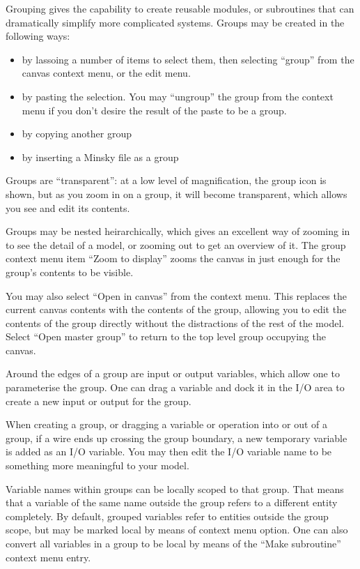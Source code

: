 \label{Group}


Grouping gives the capability to create reusable modules, or subroutines
that can dramatically simplify more complicated systems. Groups may
be created in the following ways: 
\begin{itemize}
\item by lassoing a number of items to select them, then selecting ``group''
from the canvas context menu, or the edit menu. 
\item by pasting the selection. You may ``ungroup'' the group from the
context menu if you don't desire the result of the paste to be a group. 
\item by copying another group 
\item by inserting a Minsky file as a group 
\end{itemize}
Groups are ``transparent'': at a low level of magnification, the
group icon is shown, but as you zoom in on a group, it will become
transparent, which allows you see and edit its contents. 

Groups may be nested heirarchically, which gives an excellent way
of zooming in to see the detail of a model, or zooming out to get
an overview of it. The group context menu item ``Zoom to display''
zooms the canvas in just enough for the group's contents to be visible.

You may also select ``Open in canvas'' from the context menu. This
replaces the current canvas contents with the contents of the group,
allowing you to edit the contents of the group directly without the
distractions of the rest of the model. Select ``Open master group''
to return to the top level group occupying the canvas.

Around the edges of a group are input or output variables, which allow
one to parameterise the group. One can drag a variable and dock it
in the I/O area to create a new input or output for the group.

When creating a group, or dragging a variable or operation into or
out of a group, if a wire ends up crossing the group boundary, a new
temporary variable is added as an I/O variable. You may then edit
the I/O variable name to be something more meaningful to your model.

Variable names within groups can be locally scoped to that group.
That means that a variable of the same name outside the group refers
to a different entity completely. By default, grouped variables refer
to entities outside the group scope, but may be marked local by means
of context menu option. One can also convert all variables in a group
to be local by means of the ``Make subroutine'' context menu entry.

